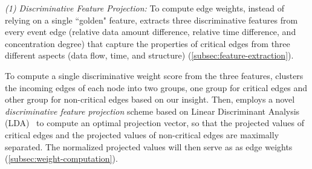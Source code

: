 \emph{(1) Discriminative Feature Projection:} 
To compute edge weights,
instead of relying on a single ``golden" feature, \tool extracts three discriminative features from every event edge (\ie relative data amount difference, relative time difference, and concentration degree) that capture the properties of critical edges from three different aspects (\ie data flow, time, and structure) (\cref{subsec:feature-extraction}).
%

To compute a single discriminative weight score from the three features,
\tool clusters the incoming edges of each node into two groups, \ie one group for critical edges and other group for non-critical edges based on our insight. 
Then, \tool employs a novel \emph{discriminative feature projection} scheme based on Linear Discriminant Analysis (LDA)~\cite{Mika99fisherdiscriminant} to compute an optimal projection vector, so that the projected values of critical edges and the projected values of non-critical edges are maximally separated.
The normalized projected values will then serve as as edge weights (\cref{subsec:weight-computation}).




